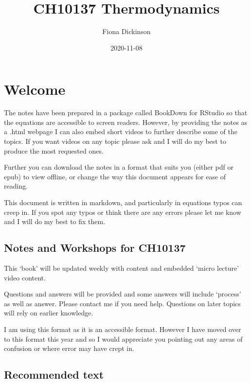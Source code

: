 \documentclass[
]{book}
\title{CH10137 Thermodynamics}
\author{Fiona Dickinson}
\date{2020-11-08}
\begin{document}
\maketitle

{
\setcounter{tocdepth}{1}
\tableofcontents
}
\hypertarget{welcome}{%
\chapter*{Welcome}\label{welcome}}

The notes have been prepared in a package called BookDown for RStudio so that the equations are accessible to screen readers. However, by providing the notes as a .html webpage I can also embed short videos to further describe some of the topics. If you want videos on any topic please ask and I will do my best to produce the most requested ones.

Further you can download the notes in a format that suits you (either pdf or epub) to view offline, or change the way this document appears for ease of reading.

This document is written in markdown, and particularly in equations typos can creep in. If you spot any typos or think there are any errors please let me know and I will do my best to fix them.

\hypertarget{notes-and-workshops-for-ch10137}{%
\section*{Notes and Workshops for CH10137}\label{notes-and-workshops-for-ch10137}}

This `book' will be updated weekly with content and embedded `micro lecture' video content.

Questions and answers will be provided and some answers will include `process' as well as answer. Please contact me if you need help. Questions on later topics will rely on earlier knowledge.

I am using this format as it is an accessible format. However I have moved over to this format this year and so I would appreciate you pointing out any areas of confusion or where error may have crept in.

\hypertarget{recommended-text}{%
\section*{Recommended text}\label{recommended-text}}
\end{document}
